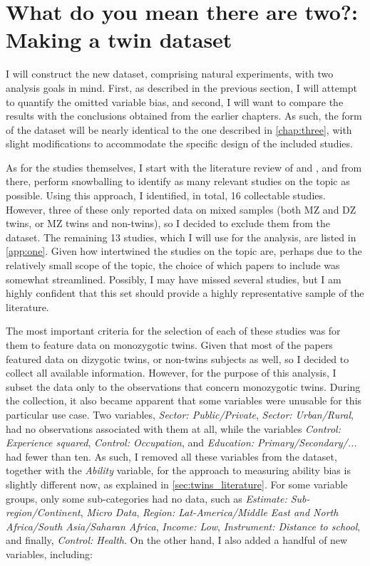 \section{What do you mean there are two?: Making a twin dataset}
\label{sec:twins_data}

I will construct the new dataset, comprising natural experiments, with two analysis goals in mind. First, as described in the previous section, I will attempt to quantify the omitted variable bias, and second, I will want to compare the results with the conclusions obtained from the earlier chapters. As such, the form of the dataset will be nearly identical to the one described in \autoref{chap:three}, with slight modifications to accommodate the specific design of the included studies.

As for the studies themselves, I start with the literature review of \cite{nakamuro2012estimating} and \cite{li2012estimating}, and from there, perform snowballing to identify as many relevant studies on the topic as possible. Using this approach, I identified, in total, 16 collectable studies. However, three of these only reported data on mixed samples (both MZ and DZ twins, or MZ twins and non-twins), so I decided to exclude them from the dataset. The remaining 13 studies, which I will use for the analysis, are listed in \autoref{app:one}.  Given how intertwined the studies on the topic are, perhaps due to the relatively small scope of the topic, the choice of which papers to include was somewhat streamlined. Possibly, I may have missed several studies, but I am highly confident that this set should provide a highly representative sample of the literature.

The most important criteria for the selection of each of these studies was for them to feature data on monozygotic twins. Given that most of the papers featured data on dizygotic twins, or non-twins subjects as well, so I decided to collect all available information. However, for the purpose of this analysis, I subset the data only to the observations that concern monozygotic twins. During the collection, it also became apparent that some variables were unusable for this particular use case. Two variables, \textit{Sector: Public/Private}, \textit{Sector: Urban/Rural}, had no observations associated with them at all, while the variables \textit{Control: Experience squared}, \textit{Control: Occupation}, and \textit{Education: Primary/Secondary/...} had fewer than ten. As such, I removed all these variables from the dataset, together with the \textit{Ability} variable, for the approach to measuring ability bias is slightly different now, as explained in \autoref{sec:twins_literature}. For some variable groups, only some sub-categories had no data, such as \textit{Estimate: Sub-region/Continent}, \textit{Micro Data}, \textit{Region: Lat-America/Middle East and North Africa/South Asia/Saharan Africa}, \textit{Income: Low}, \textit{Instrument: Distance to school}, and finally, \textit{Control: Health}. On the other hand, I also added a handful of new variables, including:


